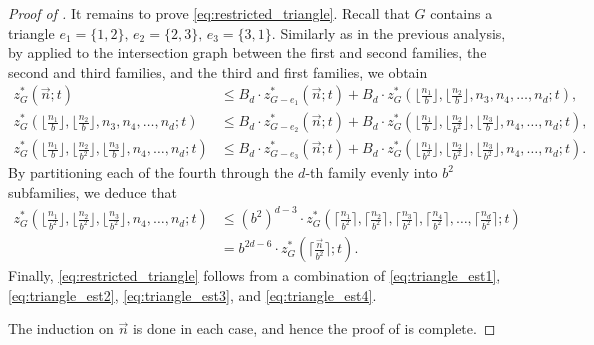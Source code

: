 \documentclass[11pt]{article}
\theoremstyle{definition}
\newcommand*{\vn}{\vec{n}}
\begin{document}
\begin{proof}[Proof of ]
    \smallskip
    
    It remains to prove \eqref{eq:restricted_triangle}. Recall that $G$ contains a triangle $e_1 = \{1, 2\}, \, e_2 = \{2, 3\}, \, e_3 = \{3, 1\}$. Similarly as in the previous analysis, by  applied to the intersection graph between the first and second families, the second and third families, and the third and first families, we obtain
    \begin{align}
        z^*_G(\vn; t) &\le B_d \cdot z^*_{G-e_1}(\vn; t) + B_d \cdot z^*_G( \lfloor \tfrac{n_1}{b} \rfloor, \lfloor \tfrac{n_2}{b} \rfloor, n_3, n_4, \dots, n_d; t), \label{eq:triangle_est1} \\
        z^*_G( \lfloor \tfrac{n_1}{b} \rfloor, \lfloor \tfrac{n_2}{b} \rfloor, n_3, n_4, \dots, n_d; t) &\le B_d \cdot z^*_{G-e_2}(\vn; t) + B_d \cdot z^*_G( \lfloor \tfrac{n_1}{b} \rfloor, \lfloor \tfrac{n_2}{b^2} \rfloor, \lfloor \tfrac{n_3}{b} \rfloor, n_4, \dots, n_d; t), \label{eq:triangle_est2} \\
        z^*_G( \lfloor \tfrac{n_1}{b} \rfloor, \lfloor \tfrac{n_2}{b^2} \rfloor, \lfloor \tfrac{n_3}{b} \rfloor, n_4, \dots, n_d; t) &\le B_d \cdot z^*_{G-e_3}(\vn; t) + B_d \cdot z^*_G( \lfloor \tfrac{n_1}{b^2} \rfloor, \lfloor \tfrac{n_2}{b^2} \rfloor, \lfloor \tfrac{n_3}{b^2} \rfloor, n_4, \dots, n_d; t). \label{eq:triangle_est3}
    \end{align}
    By partitioning each of the fourth through the $d$-th family evenly into $b^2$ subfamilies, we deduce that
    \begin{align}
        z^*_G( \lfloor \tfrac{n_1}{b^2} \rfloor, \lfloor \tfrac{n_2}{b^2} \rfloor, \lfloor \tfrac{n_3}{b^2}\rfloor, n_4, \dots, n_d; t) &\le (b^2)^{d-3} \cdot z^*_G( \lceil \tfrac{n_1}{b^2} \rceil, \lceil \tfrac{n_2}{b^2} \rceil, \lceil \tfrac{n_3}{b^2} \rceil, \lceil \tfrac{n_4}{b^2} \rceil, \dots, \lceil \tfrac{n_d}{b^2} \rceil; t) \nonumber \\
        &= b^{2d-6} \cdot z^*_G( \lceil \tfrac{\vn}{b^2} \rceil; t). 
        \label{eq:triangle_est4}
    \end{align} 
    Finally, \eqref{eq:restricted_triangle} follows from a combination of \eqref{eq:triangle_est1}, \eqref{eq:triangle_est2}, \eqref{eq:triangle_est3}, and \eqref{eq:triangle_est4}. 
    
    \medskip
    The induction on $\vn$ is done in each case, and hence the proof of  is complete. 
\end{proof}
\end{document}

